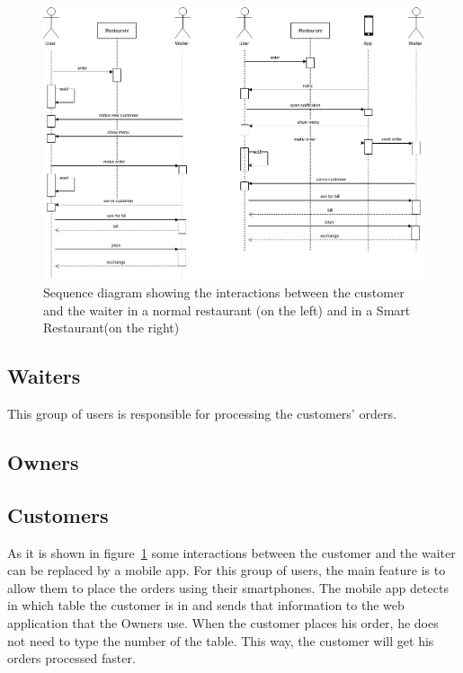 \begin{figure}[!ht]
  \centering
    \includegraphics[width=1\textwidth]{figures/smart-restaurant}
    \caption{Sequence diagram showing the interactions between
    the customer and the waiter in a normal restaurant (on the left)
    and in a Smart Restaurant(on the right)}
    \label{fig:smart_restaurant}
\end{figure}

\subsection{Waiters}
\label{sub:waiters}
%
This group of users is responsible for processing the customers' orders.


\subsection{Owners}
\label{sub:owners}

\subsection{Customers}
\label{sub:customers}
As it is shown in figure~\ref{fig:smart_restaurant} some interactions between
the customer and the waiter can be replaced by a mobile app.
For this group of users, the main feature is to allow them to place
the orders using their smartphones. The mobile app detects in which table
the customer is in and sends that information to the web application that the
Owners use. When the customer places his order, he does not need to type
the number of the table. This way, the customer will get his orders
processed faster.
